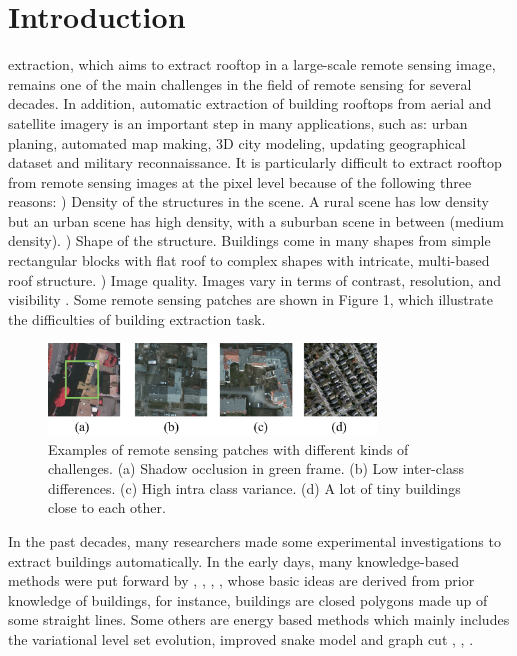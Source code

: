 %
\section{Introduction}
\label{sec:intro}
 extraction, which aims to extract rooftop in a large-scale remote sensing image, remains one of the main challenges in the field of remote sensing for several decades. In addition, automatic extraction of building rooftops from aerial and satellite imagery is an important step in many applications, such as: urban planing, automated map making, 3D city modeling, updating geographical dataset and military reconnaissance. It is particularly difficult to extract rooftop from remote sensing images at the pixel level because of the following three reasons: ) Density of the structures in the scene. A rural scene has low density but an urban scene has high density, with a suburban scene in between (medium density).  ) Shape of the structure. Buildings come in many shapes from simple rectangular blocks with flat roof to complex shapes with intricate, multi-based roof structure.  ) Image quality. Images vary in terms of contrast, resolution, and visibility  \cite{IEEEexample:huertas1988detecting}. Some remote sensing patches are shown in Figure 1, which illustrate the difficulties of building extraction task. \par
\begin{figure}
\includegraphics[width=8.7cm]{Figures/challenge.eps}
\caption{Examples of remote sensing patches with different kinds of challenges. (a) Shadow occlusion in green frame. (b) Low inter-class differences. (c) High intra class variance. (d) A lot of tiny buildings close to each other.}
\label{1}
\end{figure}
\setlength{\parindent}{2ex}In the past decades, many researchers made some experimental investigations to extract buildings automatically. In the early days, many knowledge-based methods were put forward by \cite{IEEEexample:huertas1988detecting}, \cite{IEEEexample:noronha2001detection}, \cite{IEEEexample:nosrati2009novel}, \cite{IEEEexample:izadi2012three}, \cite{IEEEexample:wang2015efficient} whose basic ideas are derived from prior knowledge of buildings, for instance, buildings are closed polygons made up of some straight lines. Some others are energy based methods which mainly includes the variational level set evolution, improved snake model and graph cut \cite{IEEEexample:cote2013automatic}, \cite{IEEEexample:peng2005improved}, \cite{IEEEexample:sirmacek2009urban}.\par
